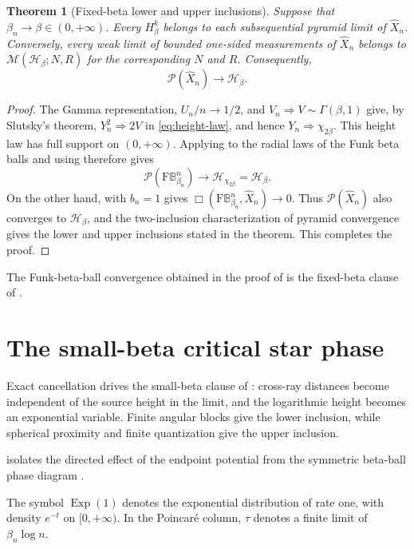 \documentclass{amsart}
\numberwithin{equation}{section}
\theoremstyle{plain}
\newtheorem{theorem}{Theorem}[section]
\theoremstyle{definition}
\theoremstyle{remark}
\newcommand{\BetaBall}{\mathrm F\mathbb B^n_{\beta_n}}
\newcommand{\Pyr}{\mathcal P}
\begin{document}
\begin{theorem}[Fixed-beta lower and upper inclusions]\label{thm:fixed-beta-convergence}
Suppose that $\beta_n\to\beta\in(0,+\infty)$.  Every $H_\beta^k$ belongs to each subsequential pyramid limit of $\widehat X_n$.  Conversely, every weak limit of bounded one-sided measurements of $\widehat X_n$ belongs to $\mathcal M(\mathcal H_\beta;N,R)$ for the corresponding $N$ and $R$.  Consequently,
\[ \Pyr(\widehat X_n)\longrightarrow\mathcal H_\beta. \]
\end{theorem}

\begin{proof}
The Gamma representation, $U_n/n\to1/2$, and $V_n\Rightarrow V\sim\Gamma(\beta,1)$ give, by Slutsky's theorem,
$Y_n^2\Rightarrow2V$ in \eqref{eq:height-law}, and hence $Y_n\Rightarrow\chi_{2\beta}$.  This height law has full support
on $(0,+\infty)$.  Applying  to the radial laws of the Funk beta balls and using
 therefore gives
\[
 \Pyr(\BetaBall)\longrightarrow\mathcal H_{\chi_{2\beta}}=\mathcal H_\beta.
\]
On the other hand,  with $b_n=1$ gives
$\Box(\BetaBall,\widehat X_n)\to0$.  Thus $\Pyr(\widehat X_n)$ also converges to $\mathcal H_\beta$, and the
two-inclusion characterization of pyramid convergence gives the lower and upper inclusions stated in the theorem.  This
completes the proof.
\end{proof}

The Funk-beta-ball convergence obtained in the proof of  is the fixed-beta clause of
.

\section{The small-beta critical star phase}\label{sec:small-beta}

Exact cancellation drives the small-beta clause of : cross-ray distances become independent of the source height in the limit, and the logarithmic height becomes an exponential variable.  Finite angular blocks give the lower inclusion, while spherical proximity and finite quantization give the upper inclusion.

 isolates the directed effect of the endpoint potential from the symmetric beta-ball phase diagram \cite{yokota-poincare-beta-balls}.

The symbol $\operatorname{Exp}(1)$ denotes the exponential distribution of rate one, with density $e^{-t}$ on $[0,+\infty)$.
In the Poincar\'e column, $\tau$ denotes a finite limit of $\beta_n\log n$.
\end{document}
